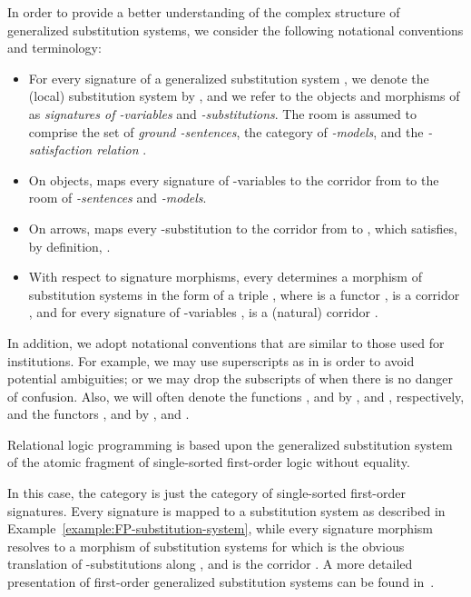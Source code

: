 \documentclass{LMCS}
\begin{document}
  \noindent In order to provide a better understanding of the complex structure of generalized substitution systems, we consider the following notational conventions and terminology:
  \begin{itemize}[label=]

  \item For every signature  of a generalized substitution system , we denote the (local) substitution system  by , and we refer to the objects and morphisms of  as \emph{signatures of \nb-variables} and \emph{\nb-substitutions}.
    The room  is assumed to comprise the set  of \emph{ground \nb-sentences}, the category  of \emph{\nb-models}, and the \emph{\nb-satisfaction relation} .

  \item On objects,  maps every signature of \nb-variables  to the corridor  from  to the room  of \emph{\nb-sentences} and \emph{\nb-models}.
    

  \item On arrows,  maps every \nb-substitution  to the corridor  from  to , which satisfies, by definition, .
    

  \item With respect to signature morphisms, every  determines a morphism of substitution systems  in the form of a triple , where  is a functor ,  is a corridor , and for every signature of \nb-variables ,  is a (natural) corridor .
    

  \end{itemize}
 \noindent In addition, we adopt notational conventions that are similar to those used for institutions.
  For example, we may use superscripts as in  is order to avoid potential ambiguities; or we may drop the subscripts of  when there is no danger of confusion.
  Also, we will often denote the functions ,  and  by ,  and , respectively, and the functors ,  and  by ,  and .

  \begin{exa}
    Relational logic programming is based upon the generalized substitution system  of the atomic fragment of single-sorted first-order logic  without equality.
    
    In this case, the category  is just the category of single-sorted first-order signatures.
    Every signature  is  mapped to a substitution system  as described in Example~\ref{example:FP-substitution-system}, while every signature morphism  resolves to a morphism of substitution systems for which  is the obvious translation of \nb-substitutions along , and  is the corridor .
    A more detailed presentation of first-order generalized substitution systems can be found in~\cite{Tutu-Fiadeiro:Institution-independent-logic-programming-2015}.
  \end{exa}
\end{document}
